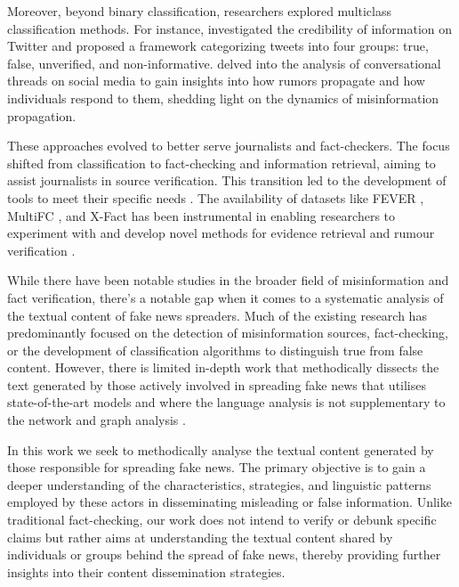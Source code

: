 Moreover, beyond binary classification, researchers explored multiclass classification methods. For instance, \citet{castillo2011information} investigated the credibility of information on Twitter and proposed a framework categorizing tweets into four groups: true, false, unverified, and non-informative. \citet{zubiaga2016analysing} delved into the analysis of conversational threads on social media to gain insights into how rumors propagate and how individuals respond to them, shedding light on the dynamics of misinformation propagation.

These approaches evolved to better serve journalists and fact-checkers. The focus shifted from classification to fact-checking and information retrieval, aiming to assist journalists in source verification. This transition led to the development of tools to meet their specific needs \cite{schlichtkrull2023intended}. The availability of datasets like FEVER \cite{thorne2018fever}, MultiFC \cite{Augenstein2019multific}, and X-Fact \cite{gupta2021x} has been instrumental in enabling researchers to experiment with and develop novel methods for evidence retrieval and rumour verification \cite{nasir2021fake, lee2020language, lewis2020retrieval}.



While there have been notable studies in the broader field of misinformation and fact verification, there's a notable gap when it comes to a systematic analysis of the textual content of fake news spreaders. Much of the existing research has predominantly focused on the detection of misinformation sources, fact-checking, or the development of classification algorithms to distinguish true from false content. However, there is limited in-depth work that methodically dissects the text generated by those actively involved in spreading fake news that utilises state-of-the-art models \cite{ghanem2020factweet, rangel2020overview} and where the language analysis is not supplementary to the network and graph analysis \cite{aswani2019experience}. 

In this work we seek to methodically analyse the textual content generated by those responsible for spreading fake news. The primary objective is to gain a deeper understanding of the characteristics, strategies, and linguistic patterns employed by these actors in disseminating misleading or false information. Unlike traditional fact-checking, our work  does not intend to verify or debunk specific claims but rather aims at understanding the textual content shared by individuals or groups behind the spread of fake news, thereby providing further insights into their content dissemination strategies.


